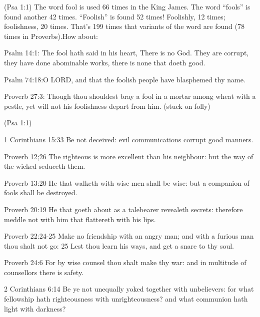 
\begin{compactenum}[I.]
    \item {} (Psa 1:1) The word fool is used 66 times in the King James. The word ``fools'' is found another 42 times. ``Foolish'' is found 52 times! Foolishly, 12 times; foolishness, 20 times. That's 199 times that variants of the word are found (78 times in Proverbs).How about:
    \begin{compactenum}[A.]
		\item Psalm 14:1: The fool hath said in his heart, There is no God. They are corrupt, they have done abominable works, there is none that doeth good.
		\item Psalm 74:18:O LORD, and that the foolish people have blasphemed thy name.
		\item Proverb 27:3:  Though thou shouldest bray a fool in a mortar among wheat with a pestle, yet will not his foolishness depart from him. (stuck on folly)
	\end{compactenum}
    \item {} (Psa 1:1)
    \begin{compactenum}[A.]
    	\item 1 Corinthians 15:33 Be not deceived: evil communications corrupt good manners.
    	\item Proverb 12;26 The righteous is more excellent than his neighbour: but the way of the wicked seduceth them.
    	\item Proverb 13:20 He that walketh with wise men shall be wise: but a companion of fools shall be destroyed.
    	\item Proverb 20:19 He that goeth about as a talebearer revealeth secrets: therefore meddle not with him that flattereth with his lips.
    	\item Proverb 22:24-25 Make no friendship with an angry man; and with a furious man thou shalt not go: 25 Lest thou learn his ways, and get a snare to thy soul.
    	\item Proverb 24:6 For by wise counsel thou shalt make thy war: and in multitude of counsellors there is safety.
    	\item 2 Corinthians 6:14 Be ye not unequally yoked together with unbelievers: for what fellowship hath righteousness with unrighteousness? and what communion hath light with darkness?

\end{compactenum}
\end{compactenum}
